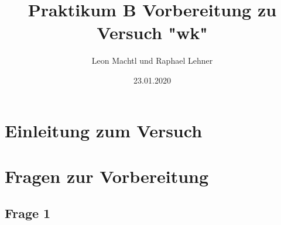 \documentclass[a4paper,10pt]{scrartcl}
\title{Praktikum B Vorbereitung zu Versuch "wk"}
\author{Leon Machtl und Raphael Lehner}
\date{23.01.2020}
\begin{document}
	\maketitle
	\tableofcontents
	\newpage
	
	\section{Einleitung zum Versuch}
		
	\section{Fragen zur Vorbereitung}
		\subsection{Frage 1}
			
		
	
\end{document}
